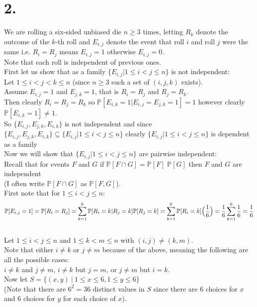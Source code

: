 \documentclass{article}
\begin{document}
\section*{2.}
\begin{center}
\doublespacing
    We are rolling a six-sided unbiased die $n\geq 3$ times, letting $R_k$ denote the outcome of the $k$-th roll and $E_{i,j}$ denote the event that roll $i$ and roll $j$ were the same i.e. $R_i = R_j$ means $E_{i,j} = 1$ otherwise $E_{i,j} = 0$.
    \\Note that each roll is independent of previous ones.
    \break
    \\First let us show that as a family $\{E_{i,j} | 1\leq i < j\leq n\}$ is not independent:
    \\Let $1\leq i < j < k\leq n$ (since $n\geq 3$ such a set of $(i, j, k)$ exists).
    \\Assume $E_{i,j} = 1$ and $E_{j,k} = 1$, that is $R_i = R_j$ and $R_j = R_k$.
    \\Then clearly $R_i = R_j = R_k$ so $\mathbb{P}[E_{i,k} = 1 | E_{i,j} = E_{j,k} = 1] = 1$ however clearly $\mathbb{P}[E_{i,k} = 1]\neq 1$.
    \\So $\{E_{i,j}, E_{j,k}, E_{i,k}\}$ is not independent and since $\{E_{i,j}, E_{j,k}, E_{i,k}\}\subseteq\{E_{i,j} | 1\leq i < j\leq n\}$ clearly $\{E_{i,j} | 1\leq i < j\leq n\}$ is dependent as a family \qedsymbol
    \break
    \\Now we will show that $\{E_{i,j} | 1\leq i < j\leq n\}$ are pairwise independent:
    \\Recall that for events $F$ and $G$ if $\mathbb{P}[F\cap G] =\mathbb{P}[F]\;\mathbb{P}[G]$ then $F$ and $G$ are independent
    \\(I often write $\mathbb{P}[F\cap G]$ as $\mathbb{P}[F, G]$).
    \\First note that for $1\leq i < j\leq n$:
    \[\mathbb{P}[E_{i,j} = 1] =\mathbb{P}[R_i = R_j] =\sum_{k=1}^6\mathbb{P}[R_i = k | R_j = k]\mathbb{P}[R_j = k] =\sum_{k=1}^6\mathbb{P}[R_i = k]\Big{(}\frac{1}{6}\Big{)} =\frac{1}{6}\sum_{k=1}^6\frac{1}{6} =\frac{1}{6}\]
    \\Let $1\leq i < j\leq n$ and $1\leq k < m\leq n$ with $(i, j)\neq (k, m)$.
    \\Note that either $i\neq k$ or $j\neq m$ because of the above, meaning the following are all the possible cases:
    \\$i\neq k$ and $j\neq m$, $i\neq k$ but $j = m$, or $j\neq m$ but $i = k$.
    \\Now let $S =\{(x,y)\:|\: 1\leq x\leq 6, 1\leq y\leq 6\}$
    \\(Note that there are $6^2 = 36$ distinct values in $S$ since there are 6 choices for $x$ and 6 choices for $y$ for each choice of $x$).
\end{center}
\end{document}
